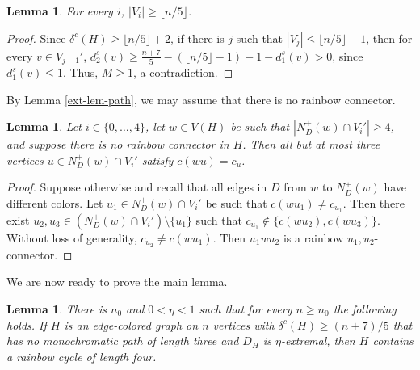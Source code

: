 \documentclass{article}
\newtheorem{lemma}[theorem]{Lemma}
\begin{document}
\begin{lemma}\label{lem}
    For every $i$, $|V_i|\geq \lfloor n/5\rfloor$.
\end{lemma}
\begin{proof}
  Since $\delta^c(H)\geq \lfloor n/5\rfloor+2$, if there is $j$ such that 
$|V_j|\leq \lfloor n/5\rfloor-1$, then for every $v\in V_{j-1}'$, $d^s_2(v)\geq \frac{n+7}{5}- (\lfloor n/5\rfloor-1) -1 -d^s_1(v)> 0$, since $d^s_1(v)\leq 1$. Thus, $M \geq 1$, a contradiction.
\end{proof}
By Lemma \ref{ext-lem-path}, we may assume that there is no rainbow connector.
\begin{lemma}\label{ext-plus-edges}
Let $i\in \{0, \dots, 4\}$, let $w\in V(H)$ be such that $|N^+_D(w)\cap V_i'|\geq 4$, and suppose there is no rainbow connector in $H$. Then all but at most three vertices $u\in N^+_D(w)\cap V_i'$ satisfy $c(wu)=c_u$. 
\end{lemma}
\begin{proof}
Suppose otherwise and recall that all edges in $D$ from $w$ to $N^+_D(w)$ have different colors. Let $u_1\in N^+_D(w)\cap V_i'$ be such that $c(wu_1)\neq c_{u_1}$. Then there exist $u_2, u_3 \in (N^+_D(w)\cap V_i') \setminus \{u_1\}$ such that $c_{u_1}\notin \{c(wu_2), c(wu_3)\}$. Without loss of generality, $c_{u_2}\neq c(wu_1)$. Then $u_1wu_2$ is a rainbow $u_1,u_2$-connector.
\end{proof}
We are now ready to prove the main lemma.
\begin{lemma}\label{lem-C4-extremal}
There is $n_0$  and $0<\eta<1$ such that for every $n\geq n_0$ the following holds. If  $H$ is an edge-colored graph on $n$ vertices with $\delta^c(H)\geq (n+7)/5$ that has no monochromatic path of length three and $D_H$ is $\eta$-extremal, then $H$ contains a rainbow cycle of length four.
\end{lemma}
\end{document}
